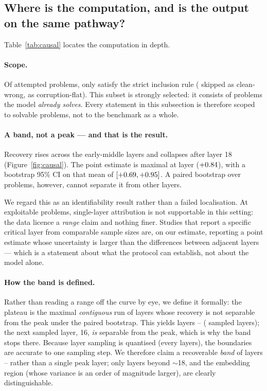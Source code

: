 \documentclass[10pt,letterpaper]{article}
\begin{document}
\subsection{Where is the computation, and is the output on the same pathway?}
\label{sec:causal}
Table~\ref{tab:causal} locates the computation in depth.



\paragraph{Scope.}
Of \nbCausalAttempts{} attempted problems, only \nbCausalValid{} satisfy the
strict inclusion rule (\nbCausalCleanWrong{} skipped as clean-wrong,
\nbCausalFlat{} as corruption-flat). This subset is strongly selected: it consists
of problems the model \emph{already solves}. Every statement in this subsection is
therefore scoped to solvable problems, not to the benchmark as a whole.

\paragraph{A band, not a peak --- and that is the result.}
Recovery rises across the early-middle layers and collapses after layer 18
(Figure~\ref{fig:causal}). The point estimate is maximal at layer \peakLayer{}
($+0.84$), with a bootstrap 95\% CI on that mean of
$[+0.69, +0.95]$. A paired bootstrap over problems, however, cannot
separate it from \nbNonseparableLayers{} other layers.

We regard this as an identifiability result rather than a failed localisation. At
\nbCausalValid{} exploitable problems, single-layer attribution is not supportable
in this setting: the data licence a \emph{range} claim and nothing finer. Studies
that report a specific critical layer from comparable sample sizes are, on our
estimate, reporting a point estimate whose uncertainty is larger than the
differences between adjacent layers --- which is a statement about what the
protocol can establish, not about the model alone.

\paragraph{How the band is defined.}
Rather than reading a range off the curve by eye, we define it formally: the plateau
is the maximal \emph{contiguous} run of layers whose recovery is not separable from
the peak under the paired bootstrap. This yields layers \plateauLo--\plateauHi{}
(\nbPlateauLayers{} sampled layers); the next sampled layer, 16, \emph{is} separable
from the peak, which is why the band stops there. Because layer sampling is
quantised (every \nbLayerStep{} layers), the boundaries are accurate to one sampling
step. We therefore claim a recoverable \emph{band} of layers \plateauLo--\plateauHi{}
rather than a single peak layer; only layers beyond $\sim$18, and the embedding
region (whose variance is an order of magnitude larger), are clearly
distinguishable.
\end{document}
